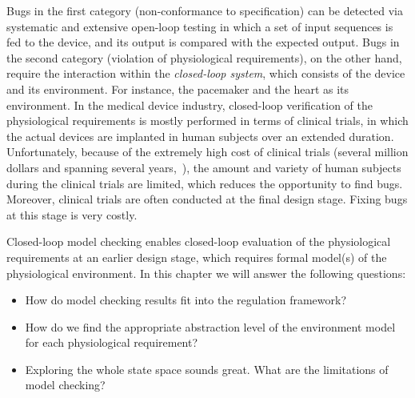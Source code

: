 Bugs in the first category (non-conformance to specification) can be detected via systematic and extensive open-loop testing in which a set of input sequences is fed to the device, and its output is compared with the expected output.
Bugs in the second category (violation of physiological requirements), on the other hand, require the interaction within the \emph{closed-loop system}, which consists of the device and its environment.
For instance, the pacemaker and the heart as its environment. 
In the medical device industry, closed-loop verification of the physiological requirements is mostly performed in terms of clinical trials, in which the actual devices are implanted in human subjects over an extended duration.
Unfortunately, because of the extremely high cost of clinical trials (several million dollars and spanning several years,~\cite{trialcost}), the amount and variety of human subjects during the clinical trials are limited, which reduces the opportunity to find bugs. 
Moreover, clinical trials are often conducted at the final design stage. Fixing bugs at this stage is very costly.

Closed-loop model checking enables closed-loop evaluation of the physiological requirements at an earlier design stage, which requires formal model(s) of the physiological environment. In this chapter we will answer the following questions:
\begin{itemize}	
\vspace{-5pt}
	\item How do model checking results fit into the regulation framework?
	\vspace{-5pt}
	\item How do we find the appropriate abstraction level of the environment model for each physiological requirement?
        \vspace{-5pt}
        \item Exploring the whole state space sounds great. What are the limitations of model checking? 
\end{itemize}

